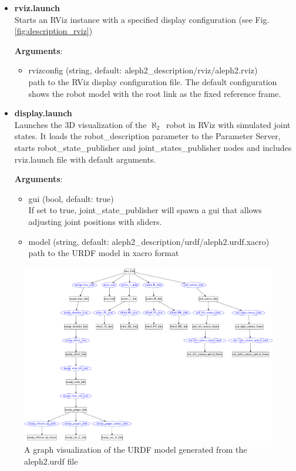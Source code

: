 \documentclass[english,inz,shortabstract]{iithesis}
\newcommand{\val}[1]{\textbf{\textsf{#1}}}
\newcommand{\rovername}{$\aleph_2$\ }
\begin{document}
		\begin{itemize}
			\item \val{rviz.launch}\\
			Starts an RViz instance with a specified display configuration (see Fig. \ref{fig:description_rviz})

			\textbf{Arguments}:
			\begin{itemize}[itemsep=0pt, parsep=2pt, topsep=0pt]
				\item \textsf{rvizconfig} (\textsf{string}, default: \textsf{aleph2\_description/rviz/aleph2.rviz})\\
				path to the RViz display configuration file. The default configuration shows the robot model with the root link as the fixed reference frame.
			\end{itemize}

			\item \val{display.launch}\\
			Launches the 3D visualization of the \rovername robot in RViz with simulated joint states. It loads the \textsf{robot\_description} parameter to the Parameter Server, starts \textsf{robot\_state\_publisher} and \textsf{joint\_states\_publisher} nodes and includes \textsf{rviz.launch} file with default arguments.

			\textbf{Arguments}:
			\begin{itemize}[itemsep=0pt, parsep=2pt, topsep=0pt]
				\item \textsf{gui} (\textsf{bool}, default: \textsf{true})\\
				If set to \textsf{true}, \textsf{joint\_state\_publisher} will spawn a gui that allows adjusting joint positions with sliders.
				\item \textsf{model} (\textsf{string}, default: \textsf{aleph2\_description/urdf/aleph2.urdf.xacro})\\
				path to the URDF model in xacro format
			\end{itemize}
		\end{itemize}

	\begin{figure}[ht]
		\centering
		\captionsetup{margin=2cm}
		\includegraphics[width=\textwidth]{img/aleph2_description.pdf}
		\caption{A graph visualization of the URDF model generated from the \textsf{aleph2.urdf} file}
		\label{fig:aleph2_description}
	\end{figure}
\end{document}

